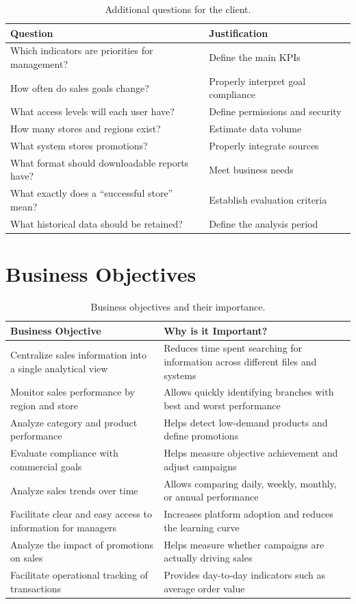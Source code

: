\documentclass[12pt,a4paper]{article}
\begin{document}
\begin{table}[H]
\centering
\begin{tabular}{p{6cm} p{7cm}}
\toprule
\textbf{Question} & \textbf{Justification}\\
\midrule
Which indicators are priorities for management? & Define the main KPIs\\
How often do sales goals change? & Properly interpret goal compliance\\
What access levels will each user have? & Define permissions and security\\
How many stores and regions exist? & Estimate data volume\\
What system stores promotions? & Properly integrate sources\\
What format should downloadable reports have? & Meet business needs\\
What exactly does a ``successful store'' mean? & Establish evaluation criteria\\
What historical data should be retained? & Define the analysis period\\
\bottomrule
\end{tabular}
\caption{Additional questions for the client.}
\end{table}

\section{Business Objectives}

\begin{table}[H]
\centering
\small
\begin{tabular}{p{5.5cm} p{8cm}}
\toprule
\textbf{Business Objective} & \textbf{Why is it Important?}\\
\midrule
Centralize sales information into a single analytical view & Reduces time spent searching for information across different files and systems\\
Monitor sales performance by region and store & Allows quickly identifying branches with best and worst performance\\
Analyze category and product performance & Helps detect low-demand products and define promotions\\
Evaluate compliance with commercial goals & Helps measure objective achievement and adjust campaigns\\
Analyze sales trends over time & Allows comparing daily, weekly, monthly, or annual performance\\
Facilitate clear and easy access to information for managers & Increases platform adoption and reduces the learning curve\\
Analyze the impact of promotions on sales & Helps measure whether campaigns are actually driving sales\\
Facilitate operational tracking of transactions & Provides day-to-day indicators such as average order value\\
\bottomrule
\end{tabular}
\caption{Business objectives and their importance.}
\end{table}
\end{document}
